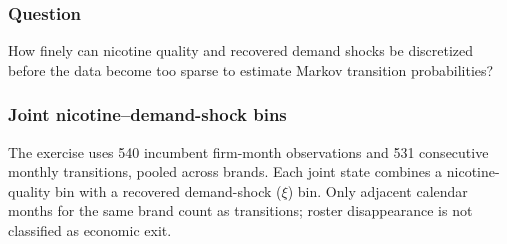 \documentclass[10pt,]{article}
\begin{document}
\subsubsection{Question}\label{question-1}

How finely can nicotine quality and recovered demand shocks be
discretized before the data become too sparse to estimate Markov
transition probabilities?

\subsubsection{Joint nicotine--demand-shock
bins}\label{joint-nicotinedemand-shock-bins}

The exercise uses 540 incumbent firm-month observations and 531
consecutive monthly transitions, pooled across brands. Each joint state
combines a nicotine-quality bin with a recovered demand-shock (\(\xi\))
bin. Only adjacent calendar months for the same brand count as
transitions; roster disappearance is not classified as economic exit.
\end{document}
